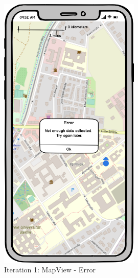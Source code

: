 \begin{figure}[H]
\begin{minipage}[b]{0.45\textwidth}
    \includegraphics[width=0.6\textwidth]{images/UI/Iteration1-MapView-Error.png}
    \caption{Iteration 1: MapView - Error}
    \label{fig:i1-mv-error}
  \end{minipage}
\end{figure}

